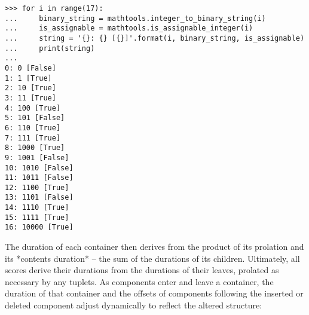 \begin{comment}
<abjad>
for i in range(17):
    binary_string = mathtools.integer_to_binary_string(i)
    is_assignable = mathtools.is_assignable_integer(i)
    string = '{}: {} [{}]'.format(i, binary_string, is_assignable)
    print(string)

</abjad>
\end{comment}

\begin{abjadbookoutput}
\begin{singlespacing}
\vspace{-0.5\baselineskip}
\begin{lstlisting}
>>> for i in range(17):
...     binary_string = mathtools.integer_to_binary_string(i)
...     is_assignable = mathtools.is_assignable_integer(i)
...     string = '{}: {} [{}]'.format(i, binary_string, is_assignable)
...     print(string)
...
0: 0 [False]
1: 1 [True]
2: 10 [True]
3: 11 [True]
4: 100 [True]
5: 101 [False]
6: 110 [True]
7: 111 [True]
8: 1000 [True]
9: 1001 [False]
10: 1010 [False]
11: 1011 [False]
12: 1100 [True]
13: 1101 [False]
14: 1110 [True]
15: 1111 [True]
16: 10000 [True]
\end{lstlisting}
\end{singlespacing}
\end{abjadbookoutput}

\noindent The duration of each container then derives from the product of its
prolation and its *contents duration* -- the sum of the durations of its
children. Ultimately, all scores derive their durations from the durations of
their leaves, prolated as necessary by any tuplets. As components enter and
leave a container, the duration of that container and the offsets of components
following the inserted or deleted component adjust dynamically to reflect the
altered structure:

\begin{comment}
<abjad>
staff = Staff("c'4 d'4 e'4 f'4")
show(staff)
inspect_(staff).get_duration()
for leaf in staff:
    offset = inspect_(leaf).get_timespan().start_offset
    print(offset, leaf)

</abjad>
\end{comment}

